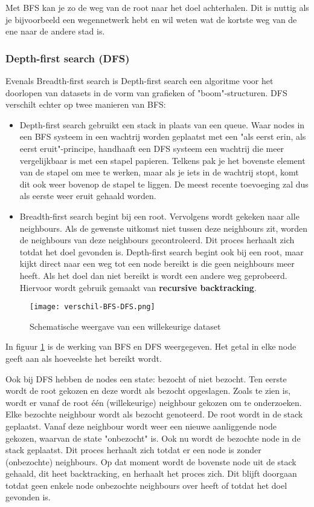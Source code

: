 Met BFS kan je zo de weg van de root naar het doel achterhalen. Dit is nuttig als je bijvoorbeeld een wegennetwerk hebt en wil weten wat de kortste weg van de ene naar de andere stad is.

\subsubsection{Depth-first search (DFS)}
Evenals Breadth-first search is Depth-first search een algoritme voor het doorlopen van datasets in de vorm van grafieken of "boom"-structuren. DFS verschilt echter op twee manieren van BFS:

\begin{itemize}
\item Depth-first search gebruikt een stack in plaats van een queue. Waar nodes in een BFS systeem in een wachtrij worden geplaatst met een "als eerst erin, als eerst eruit"-principe, handhaaft een DFS systeem een wachtrij die meer vergelijkbaar is met een stapel papieren. Telkens pak je het bovenste element van de stapel om mee te werken, maar als je iets in de wachtrij stopt, komt dit ook weer bovenop de stapel te liggen. De meest recente toevoeging zal dus als eerste weer eruit gehaald worden.
\item Breadth-first search begint bij een root. Vervolgens wordt gekeken naar alle neighbours. Als de gewenste uitkomst niet tussen deze neighbours zit, worden de neighbours van deze neighbours gecontroleerd. Dit proces herhaalt zich totdat het doel gevonden is.
Depth-first search begint ook bij een root, maar kijkt direct naar een weg tot een node bereikt is die geen neighbours meer heeft. Als het doel dan niet bereikt is wordt een andere weg geprobeerd. Hiervoor wordt gebruik gemaakt van \textbf{recursive backtracking}.

\end{itemize}

\begin{figure}[H]
  \centering
    \texttt{[image: verschil-BFS-DFS.png]}
  \caption{Schematische weergave van een willekeurige dataset}
  \label{fig:verschil-BFS-DFS}
\end{figure}

In figuur \ref{fig:verschil-BFS-DFS} is de werking van BFS en DFS weergegeven. Het getal in elke node geeft aan als hoeveelste het bereikt wordt. 

Ook bij DFS hebben de nodes een state: bezocht of niet bezocht.
Ten eerste wordt de root gekozen en deze wordt als bezocht opgeslagen. Zoals te zien is, wordt er vanaf de root \'e\'en (willekeurige) neighbour gekozen om te onderzoeken. Elke bezochte neighbour wordt als bezocht genoteerd. De root wordt in de stack geplaatst. Vanaf deze neighbour wordt weer een nieuwe aanliggende node gekozen, waarvan de state "onbezocht" is. Ook nu wordt de bezochte node in de stack geplaatst. Dit proces herhaalt zich totdat er een node is zonder (onbezochte) neighbours. Op dat moment wordt de bovenste node uit de stack gehaald, dit heet backtracking, en herhaalt het proces zich. Dit blijft doorgaan totdat geen enkele node onbezochte neighbours over heeft of totdat het doel gevonden is.

